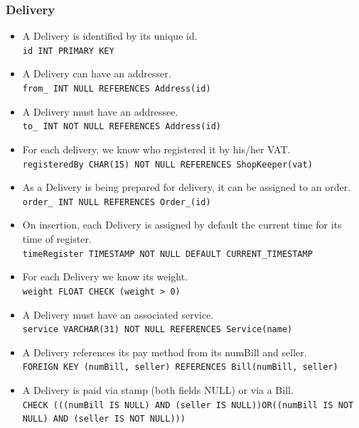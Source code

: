 \documentclass{report}[a4paper]
\theoremstyle{remark}
\begin{document}
\subsubsection{Delivery}
\begin{itemize}
    \item A Delivery is identified by its unique id.                                                        \\ \texttt{id INT PRIMARY KEY}
    \item A Delivery can have an addresser.                                                                 \\ \texttt{from\_ INT NULL REFERENCES Address(id)}
    \item A Delivery must have an addressee.                                                                \\ \texttt{to\_ INT NOT NULL REFERENCES Address(id)}
    \item For each delivery, we know who registered it by his/her VAT.                                      \\ \texttt{registeredBy CHAR(15) NOT NULL REFERENCES ShopKeeper(vat)}
    \item As a Delivery is being prepared for delivery, it can be assigned to an order.                     \\ \texttt{order\_ INT NULL REFERENCES Order\_(id)}
    \item On insertion, each Delivery is assigned by default the current time for its time of register.     \\ \texttt{timeRegister TIMESTAMP NOT NULL DEFAULT CURRENT\_TIMESTAMP}
    \item For each Delivery we know its weight.                                                             \\ \texttt{weight FLOAT CHECK (weight > 0)}
    \item A Delivery must have an associated service.                                                       \\ \texttt{service VARCHAR(31) NOT NULL REFERENCES Service(name)}
    \item A Delivery references its pay method from its numBill and seller.                                 \\ \texttt{FOREIGN KEY (numBill, seller) REFERENCES Bill(numBill, seller)}
    \item A Delivery is paid via stamp (both fields NULL) or via a Bill.                                    \\ \texttt{CHECK (((numBill IS NULL) AND (seller IS NULL))OR((numBill IS NOT NULL) AND (seller IS NOT NULL)))}
\end{itemize}
\end{document}
